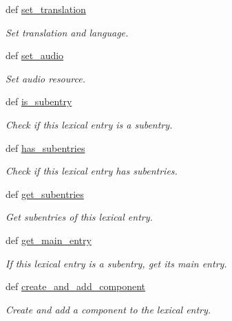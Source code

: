 \begin{DoxyCompactItemize}
def \hyperlink{classlmf_1_1src_1_1core_1_1lexical__entry_1_1_lexical_entry_a8b90d3fd26d1c8f54f36810ca63e156a}{set\+\_\+translation}
\begin{DoxyCompactList}\small\item\em Set translation and language. \end{DoxyCompactList}\item 
def \hyperlink{classlmf_1_1src_1_1core_1_1lexical__entry_1_1_lexical_entry_ab876a6ced2f3919efb81d72286419c01}{set\+\_\+audio}
\begin{DoxyCompactList}\small\item\em Set audio resource. \end{DoxyCompactList}\item 
def \hyperlink{classlmf_1_1src_1_1core_1_1lexical__entry_1_1_lexical_entry_ac7d5e6cc18edad83387ae547e408035e}{is\+\_\+subentry}
\begin{DoxyCompactList}\small\item\em Check if this lexical entry is a subentry. \end{DoxyCompactList}\item 
def \hyperlink{classlmf_1_1src_1_1core_1_1lexical__entry_1_1_lexical_entry_adea1f58c4350fac27bdcd829c3e6cd54}{has\+\_\+subentries}
\begin{DoxyCompactList}\small\item\em Check if this lexical entry has subentries. \end{DoxyCompactList}\item 
def \hyperlink{classlmf_1_1src_1_1core_1_1lexical__entry_1_1_lexical_entry_a1f50b9666f7738439e1c33b701de758d}{get\+\_\+subentries}
\begin{DoxyCompactList}\small\item\em Get subentries of this lexical entry. \end{DoxyCompactList}\item 
def \hyperlink{classlmf_1_1src_1_1core_1_1lexical__entry_1_1_lexical_entry_ae446eab7bcbbc3d8cb251848121f2cc0}{get\+\_\+main\+\_\+entry}
\begin{DoxyCompactList}\small\item\em If this lexical entry is a subentry, get its main entry. \end{DoxyCompactList}\item 
def \hyperlink{classlmf_1_1src_1_1core_1_1lexical__entry_1_1_lexical_entry_a3aceadc1a05034590a950e86c2720f54}{create\+\_\+and\+\_\+add\+\_\+component}
\begin{DoxyCompactList}\small\item\em Create and add a component to the lexical entry. \end{DoxyCompactList}\item 

\end{DoxyCompactItemize}
